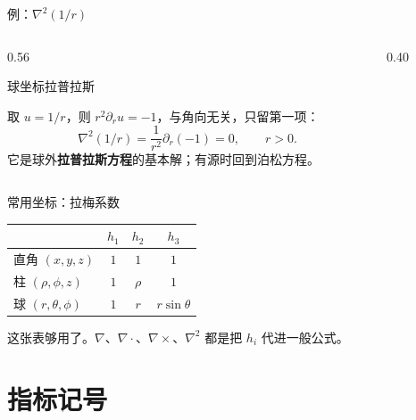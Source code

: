 \documentclass[fontset=windows, chinese, 10pt, xcolor=dvipsnames]{beamer}
\begin{document}
\begin{frame}{例：$\nabla^2(1/r)$}
  \begin{columns}[T]
    \begin{column}{0.56\textwidth}
      {\small
      球坐标拉普拉斯
      \par\smallskip
      \par\smallskip
      取 $u=1/r$，则 $r^2\partial_r u=-1$，与角向无关，只留第一项：
      \begin{equation*}
        \nabla^2(1/r)
        =\frac{1}{r^2}\partial_r(-1)=0,
        \qquad r>0.
      \end{equation*}
      它是球外\textbf{拉普拉斯方程}的基本解；有源时回到泊松方程。}
    \end{column}
    \begin{column}{0.40\textwidth}
      \centering
      \vspace{1.2em}
      \scalebox{0.82}{}
    \end{column}
  \end{columns}
\end{frame}

\begin{frame}{常用坐标：拉梅系数}
  \begin{center}
  \renewcommand{\arraystretch}{1.35}
  \begin{tabular}{lccc}
    & $h_1$ & $h_2$ & $h_3$ \\ \hline
    直角 $(x,y,z)$ & $1$ & $1$ & $1$ \\
    柱 $(\rho,\phi,z)$ & $1$ & $\rho$ & $1$ \\
    球 $(r,\theta,\phi)$ & $1$ & $r$ & $r\sin\theta$
  \end{tabular}
  \end{center}
  \vspace{0.4em}
  这张表够用了。$\nabla$、$\nabla\cdot$、$\nabla\times$、$\nabla^2$ 都是把 $h_i$ 代进一般公式。
\end{frame}

\section{指标记号}
\end{document}
